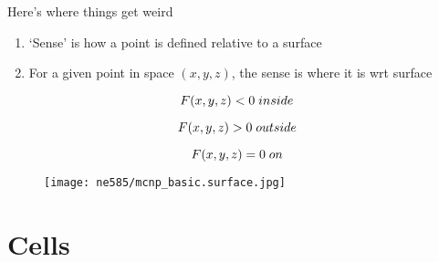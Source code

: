 \documentclass[aspectratio=1610,pdftex,dvipsnames,compress,xcolor={dvipsnames}]{beamer}
\begin{document}
\addtocounter{framenumber}{-1} 
\begin{frame}{Here's where things get weird}
    \begin{enumerate}[series=outerlist,topsep=0pt,itemsep=21pt,leftmargin=*,label=(\arabic*)]
        \item[]`Sense' is how a point is defined relative to a surface
        \item[]For a given point in space $(x,y,z)$, the sense is where it is wrt surface
    \end{enumerate}

    \vspace*{\fill}

    \begin{equation}
        \LARGE
        F(x,y,z) < 0 \; inside
    \end{equation}

    \begin{equation}
        \LARGE
        F(x,y,z) > 0 \; outside
    \end{equation}

    \begin{equation}
        \LARGE
        F(x,y,z) = 0 \; on
    \end{equation}
\end{frame}


\begin{frame}{}
    \begin{figure}
        \centering
        \texttt{[image: ne585/mcnp\_basic.surface.jpg]}
    \end{figure}
\end{frame}


\section{Cells}
\end{document}
